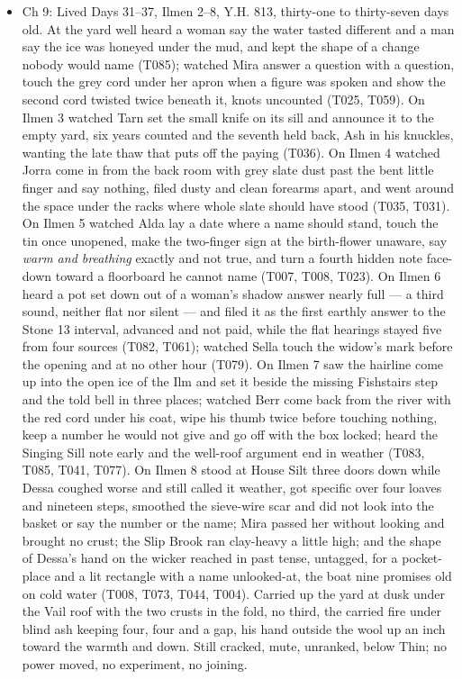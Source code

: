 \documentclass{design/chronicle}
\begin{document}
{\begin{itemize}[leftmargin=1.4em,itemsep=1pt,topsep=3pt,parsep=0pt]
\end{itemize}

\begin{itemize}[leftmargin=1.4em,itemsep=1pt,topsep=3pt,parsep=0pt]

\item Ch 9: Lived Days 31–37, Ilmen 2–8, Y.H. 813, thirty-one to thirty-seven days old. At the yard well heard a woman say the water tasted different and a man say the ice was honeyed under the mud, and kept the shape of a change nobody would name (T085); watched Mira answer a question with a question, touch the grey cord under her apron when a figure was spoken and show the second cord twisted twice beneath it, knots uncounted (T025, T059). On Ilmen 3 watched Tarn set the small knife on its sill and announce it to the empty yard, six years counted and the seventh held back, Ash in his knuckles, wanting the late thaw that puts off the paying (T036). On Ilmen 4 watched Jorra come in from the back room with grey slate dust past the bent little finger and say nothing, filed dusty and clean forearms apart, and went around the space under the racks where whole slate should have stood (T035, T031). On Ilmen 5 watched Alda lay a date where a name should stand, touch the tin once unopened, make the two-finger sign at the birth-flower unaware, say \emph{warm and breathing} exactly and not true, and turn a fourth hidden note face-down toward a floorboard he cannot name (T007, T008, T023). On Ilmen 6 heard a pot set down out of a woman’s shadow answer nearly full --- a third sound, neither flat nor silent --- and filed it as the first earthly answer to the Stone 13 interval, advanced and not paid, while the flat hearings stayed five from four sources (T082, T061); watched Sella touch the widow’s mark before the opening and at no other hour (T079). On Ilmen 7 saw the hairline come up into the open ice of the Ilm and set it beside the missing Fishstairs step and the told bell in three places; watched Berr come back from the river with the red cord under his coat, wipe his thumb twice before touching nothing, keep a number he would not give and go off with the box locked; heard the Singing Sill note early and the well-roof argument end in weather (T083, T085, T041, T077). On Ilmen 8 stood at House Silt three doors down while Dessa coughed worse and still called it weather, got specific over four loaves and nineteen steps, smoothed the sieve-wire scar and did not look into the basket or say the number or the name; Mira passed her without looking and brought no crust; the Slip Brook ran clay-heavy a little high; and the shape of Dessa’s hand on the wicker reached in past tense, untagged, for a pocket-place and a lit rectangle with a name unlooked-at, the boat nine promises old on cold water (T008, T073, T044, T004). Carried up the yard at dusk under the Vail roof with the two crusts in the fold, no third, the carried fire under blind ash keeping four, four and a gap, his hand outside the wool up an inch toward the warmth and down. Still cracked, mute, unranked, below Thin; no power moved, no experiment, no joining.


\end{itemize}}
\end{document}
